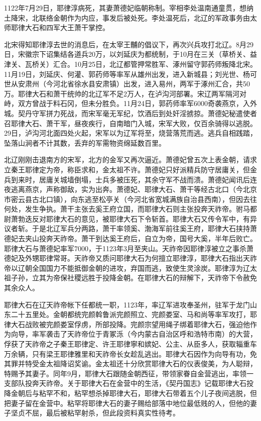 1122年7月29日，耶律淳病死，其妻萧德妃临朝称制。宰相李处温南通童贯，想纳土降宋，北联络金朝作为内应，事发后被处死。李处温死后，北辽的军政事务由太师耶律大石和四军大王萧干掌控。

北宋得知耶律淳去世的消息后，在太宰王黼的倡议下，再次兴兵攻打北辽。8月29日，宋徽宗下诏集结各道兵20万，以刘延庆为都统制，于10月在三关（草桥关、益津关、瓦桥关）汇合。10月25日，北辽都管押常胜军、涿州留守郭药师叛降北宋。11月19日，刘延庆、何灌、郭药师等率军从雄州出发，进入新城县；刘光世、杨可世从安肃州（今河北省徐水县安肃镇）出发，进入易州，两军于涿州汇合，共50万。耶律大石和萧干统帅的北辽军不足2万人，在泸沟河部署。宋辽两军隔河对峙，双方曾战于料石冈，但未分胜负。11月24日，郭药师率军6000奇袭燕京，入外城。契丹守军拼力死战，而宋军毫无军纪，饮酒后到处奸淫掳掠。萧德妃秘遣使者召耶律大石、萧干军，昼夜疾行，自南暗门入城，宋军大败，仅百余骑得以逃脱。29日，泸沟河北面四处火起，宋军以为辽军将至，烧营落荒而逃。逃兵自相践踏，坠落山涧者不计其数，丢弃的军需物资绵延数百里。

北辽刚刚击退南方的宋军，北方的金军又再次逼近。萧德妃曾五次上表金朝，请求立秦王耶律定为帝，称臣求和，金太祖不许。萧德妃只好派精兵防守居庸关，但金兵到来时，居庸关城墙倒塌，士兵多被压死，其余守军不战而溃。萧德妃闻讯后连夜逃离燕京，声称御敌，实为出奔。萧德妃、耶律大石、萧干等经古北口（今北京市密云县古北口镇），向东逃至松亭关（今河北省宽城满族自治县西南），但因去往何处，发生争执。萧干主张去奚王府立国，而耶律大石则主张投奔天祚帝。驸马都尉萧勃迭反对耶律大石的意见，被耶律大石下令斩首。耶律大石又传令军中，有异议者斩。于是北辽军兵分两路，萧干率领奚、渤海军前往奚王府，耶律大石挟持萧德妃去夹山投奔天祚帝。萧干到达奚王府后，自立为帝，国号大奚，半年后败亡。耶律大石与萧德妃率军7000，于1123年3月至夹山。天祚帝因耶律淳被立之事杀萧德妃及外甥耶律常哥。天祚帝又质问耶律大石为何擅立耶律淳，耶律大石指出天祚帝以辽朝全国国力不能抵御金朝的进攻，弃国而逃，致使生灵涂炭。耶律淳为辽太祖子孙，立其为帝保社稷远胜于投降金朝。在耶律大石的辩解下，天祚帝下令赦免其余众人。

耶律大石在辽天祚帝帐下任都统一职，1123年，率辽军进攻奉圣州，驻军于龙门山东二十五里处。金朝都统完颜斡鲁派完颜照立、完颜娄室、马和尚等率军攻打，耶律大石战败被完颜娄室俘虏，所部投降。完颜宗望用绳子绑着耶律大石，强迫他作为向导，率军袭击了天祚帝位于青冢泺（今内蒙古自治区呼和浩特市南）的大营，俘获了天祚帝之子秦王耶律定、许王耶律寧和嫔妃、公主、从臣多人，获取辎重车万余辆，只有梁王耶律雅里和天祚帝长女趁乱逃出。耶律大石因作为向导有功，免其罪并特受金太祖降诏奖谕。金太祖还十分欣赏耶律大石的仪表俊美，为人聪辩，特赐予其妻子。同年9月，耶律大石跟随金朝西征，带领家眷自金营逃出，率领一支部队投奔天祚帝。关于耶律大石在金营中的生活，《契丹国志》记载耶律大石投降金朝后与粘罕不和，粘罕想杀掉耶律大石，耶律大石带着五个儿子夜间逃脱，但把妻子留在金营中。粘罕将耶律大石的妻子赐给部落中地位最低贱的人，但他的妻子坚贞不屈，最后被粘罕射杀，但此段资料真实性待考。

